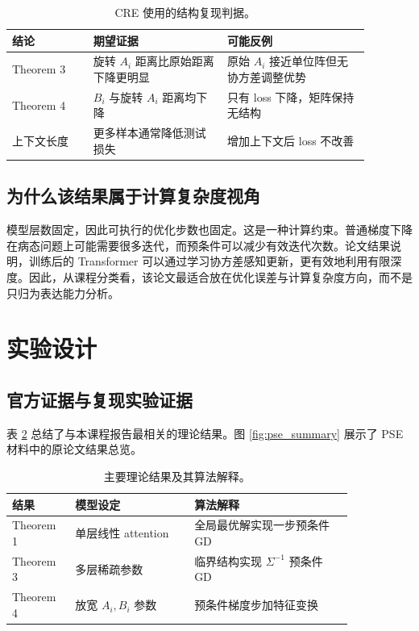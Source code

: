 \documentclass[conference]{IEEEtran}
\begin{document}
\begin{table}[!t]
\centering
\caption{CRE 使用的结构复现判据。}
\label{tab:criteria}
\begin{tabular}{p{0.20\linewidth}p{0.33\linewidth}p{0.35\linewidth}}
\toprule
结论 & 期望证据 & 可能反例\\
\midrule
Theorem 3 & 旋转 $A_i$ 距离比原始距离下降更明显 & 原始 $A_i$ 接近单位阵但无协方差调整优势\\
Theorem 4 & $B_i$ 与旋转 $A_i$ 距离均下降 & 只有 loss 下降，矩阵保持无结构\\
上下文长度 & 更多样本通常降低测试损失 & 增加上下文后 loss 不改善\\
\bottomrule
\end{tabular}
\end{table}

\subsection{为什么该结果属于计算复杂度视角}
模型层数固定，因此可执行的优化步数也固定。这是一种计算约束。普通梯度下降在病态问题上可能需要很多迭代，而预条件可以减少有效迭代次数。论文结果说明，训练后的 Transformer 可以通过学习协方差感知更新，更有效地利用有限深度。因此，从课程分类看，该论文最适合放在优化误差与计算复杂度方向，而不是只归为表达能力分析。

\section{实验设计}
\subsection{官方证据与复现实验证据}
表 \ref{tab:theory_summary} 总结了与本课程报告最相关的理论结果。图 \ref{fig:pse_summary} 展示了 PSE 材料中的原论文结果总览。

\begin{table}[!t]
\centering
\caption{主要理论结果及其算法解释。}
\label{tab:theory_summary}
\begin{tabular}{p{0.14\linewidth}p{0.30\linewidth}p{0.40\linewidth}}
\toprule
结果 & 模型设定 & 算法解释\\
\midrule
Theorem 1 & 单层线性 attention & 全局最优解实现一步预条件 GD\\
Theorem 3 & 多层稀疏参数 & 临界结构实现 $\Sigma^{-1}$ 预条件 GD\\
Theorem 4 & 放宽 $A_i,B_i$ 参数 & 预条件梯度步加特征变换\\
\bottomrule
\end{tabular}
\end{table}
\end{document}
